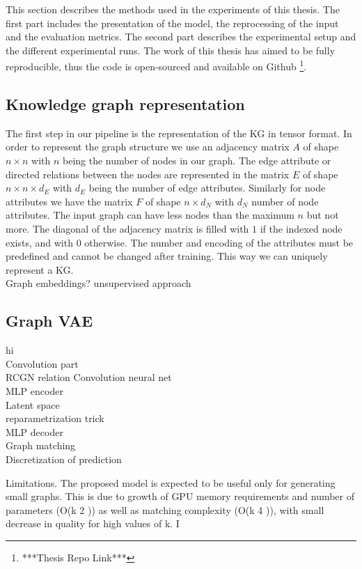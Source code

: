 This section describes the methods used in the experiments of this thesis. The first part includes the presentation of the model, the reprocessing of the input and the evaluation metrics. The second part describes the experimental setup and the different experimental runs. The work of this thesis has aimed to be fully reproducible, thus the code is open-sourced and available on Github \footnote{***Thesis Repo Link***}.

\subsection{Knowledge graph representation}

The first step in our pipeline is the representation of the KG in tensor format. In order to represent the graph structure we use an adjacency matrix $A$ of shape $n\times n$ with $n$ being the number of nodes in our graph. The edge attribute or directed relations between the nodes are represented in the matrix $E$ of shape $n\times n\times d_E$ with $d_E$ being the number of edge attributes. Similarly for node attributes we have the matrix $F$ of shape $n\times d_N$ with $d_N$ number of node attributes. The input graph can have less nodes than the maximum $n$ but not more. The diagonal of the adjacency matrix is filled with $1$ if the indexed node exists, and with $0$ otherwise. The number and encoding of the attributes must be predefined and cannot be changed after training. This way we can uniquely represent a KG.
\\


Graph embeddings? unsupervised approach

\subsection{Graph VAE}
hi
\\Convolution part
\\RCGN relation Convolution neural net
\\MLP encoder
\\Latent space
\\reparametrization trick
\\MLP decoder
\\Graph matching
\\Discretization of prediction

Limitations. The proposed model is expected to be useful
only for generating small graphs. This is due to growth
of GPU memory requirements and number of parameters
(O(k
2
)) as well as matching complexity (O(k
4
)), with small
decrease in quality for high values of k. I
\cite{simonovsky_graphvae_2018}

